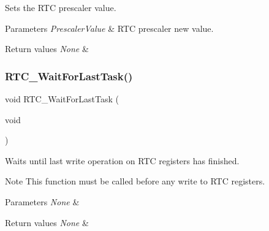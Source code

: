 Sets the R\+TC prescaler value. 


\begin{DoxyParams}{Parameters}
{\em Prescaler\+Value} & R\+TC prescaler new value. \\
\hline
\end{DoxyParams}

\begin{DoxyRetVals}{Return values}
{\em None} & \\
\hline
\end{DoxyRetVals}
\mbox{\label{group___r_t_c___private___functions_gaa0a406ef860d5231748c5f0d82673036}} 
\subsubsection{\texorpdfstring{RTC\_WaitForLastTask()}{RTC\_WaitForLastTask()}}
{\footnotesize\ttfamily void R\+T\+C\+\_\+\+Wait\+For\+Last\+Task (\begin{DoxyParamCaption}\item[{void}]{ }\end{DoxyParamCaption})}



Waits until last write operation on R\+TC registers has finished. 

\begin{DoxyNote}{Note}
This function must be called before any write to R\+TC registers. 
\end{DoxyNote}

\begin{DoxyParams}{Parameters}
{\em None} & \\
\hline
\end{DoxyParams}

\begin{DoxyRetVals}{Return values}
{\em None} & \\
\hline
\end{DoxyRetVals}
\mbox{\label{group___r_t_c___private___functions_gaca4346e0dc15dccc15179786b28450db}} 
